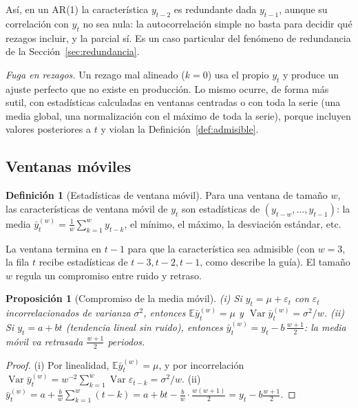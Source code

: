 \documentclass[11pt]{article}
\newtheorem{proposicion}[teorema]{Proposición}
\theoremstyle{definition}
\newtheorem{definicion}[teorema]{Definición}
\theoremstyle{remark}
\newcommand{\E}{\mathbb{E}}
\DeclareMathOperator{\Var}{Var}
\begin{document}
\noindent Así, en un AR(1) la característica $y_{t-2}$ es redundante dada $y_{t-1}$, aunque su correlación con $y_t$ no sea nula: la autocorrelación simple no basta para decidir qué rezagos incluir, y la parcial sí. Es un caso particular del fenómeno de redundancia de la Sección~\ref{sec:redundancia}.

\noindent \emph{Fuga en rezagos.} Un rezago mal alineado ($k=0$) usa el propio $y_t$ y produce un ajuste perfecto que no existe en producción. Lo mismo ocurre, de forma más sutil, con estadísticas calculadas en ventanas centradas o con toda la serie (una media global, una normalización con el máximo de toda la serie), porque incluyen valores posteriores a $t$ y violan la Definición~\ref{def:admisible}.

\subsection{Ventanas móviles}\label{sec:ventanas}

\begin{definicion}[Estadísticas de ventana móvil]\label{def:ventana}
\noindent Para una ventana de tamaño $w$, las características de ventana móvil de $y_t$ son estadísticas de $(y_{t-w},\dots,y_{t-1})$: la media $\bar y_t^{(w)}=\frac1w\sum_{k=1}^wy_{t-k}$, el mínimo, el máximo, la desviación estándar, etc.
\end{definicion}

\noindent La ventana termina en $t-1$ para que la característica sea admisible (con $w=3$, la fila $t$ recibe estadísticas de $t-3,t-2,t-1$, como describe la guía). El tamaño $w$ regula un compromiso entre ruido y retraso.

\begin{proposicion}[Compromiso de la media móvil]\label{prop:media-movil}
\noindent (i) Si $y_t=\mu+\varepsilon_t$ con $\varepsilon_t$ incorrelacionados de varianza $\sigma^2$, entonces $\E\bar y_t^{(w)}=\mu$ y $\Var\bar y_t^{(w)}=\sigma^2/w$. (ii) Si $y_t=a+bt$ (tendencia lineal sin ruido), entonces $\bar y_t^{(w)}=y_t-b\,\frac{w+1}2$: la media móvil va retrasada $\frac{w+1}{2}$ periodos.
\end{proposicion}
\begin{proof}
\noindent (i) Por linealidad, $\E\bar y_t^{(w)}=\mu$, y por incorrelación $\Var\bar y_t^{(w)}=w^{-2}\sum_{k=1}^w\Var\varepsilon_{t-k}=\sigma^2/w$. (ii) $\bar y_t^{(w)}=a+\frac bw\sum_{k=1}^w(t-k)=a+bt-\frac bw\cdot\frac{w(w+1)}2=y_t-b\frac{w+1}2$.
\end{proof}
\end{document}
